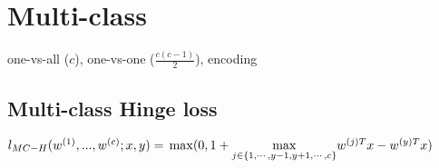 \section*{Multi-class}
one-vs-all ($c$), one-vs-one ($\frac{c (c-1)}{2}$), encoding

\subsection*{Multi-class Hinge loss}
$l_{MC-H}(w^{(1)},...,w^{(c)};x,y) =\\
\max (0,1+\underset{j\in\{1,\cdots,y-1,y+1,\cdots,c\}}{\max} w^{(j)T} x - w^{(y)T} x)$